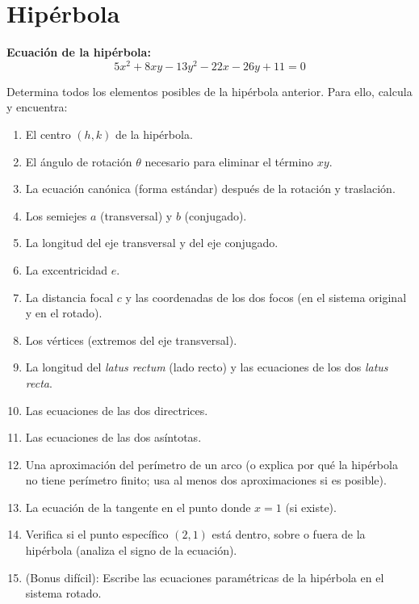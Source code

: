 \documentclass[12pt, a4paper]{article}
\begin{document}
\section{Hipérbola}
\textbf{Ecuación de la hipérbola:}
\[
5x^{2} + 8xy - 13y^{2} - 22x - 26y + 11 = 0
\]

Determina todos los elementos posibles de la hipérbola anterior. Para ello, calcula y encuentra:

\begin{enumerate}
    \item El centro \((h, k)\) de la hipérbola.
    \item El ángulo de rotación \(\theta\) necesario para eliminar el término \(xy\).
    \item La ecuación canónica (forma estándar) después de la rotación y traslación.
    \item Los semiejes \(a\) (transversal) y \(b\) (conjugado).
    \item La longitud del eje transversal y del eje conjugado.
    \item La excentricidad \(e\).
    \item La distancia focal \(c\) y las coordenadas de los dos focos (en el sistema original y en el rotado).
    \item Los vértices (extremos del eje transversal).
    \item La longitud del \textit{latus rectum} (lado recto) y las ecuaciones de los dos \textit{latus recta}.
    \item Las ecuaciones de las dos directrices.
    \item Las ecuaciones de las dos asíntotas.
    \item Una aproximación del perímetro de un arco (o explica por qué la hipérbola no tiene perímetro finito; usa al menos dos aproximaciones si es posible).
    \item La ecuación de la tangente en el punto donde \(x = 1\) (si existe).
    \item Verifica si el punto específico \((2,1)\) está dentro, sobre o fuera de la hipérbola (analiza el signo de la ecuación).
    \item (Bonus difícil): Escribe las ecuaciones paramétricas de la hipérbola en el sistema rotado.
\end{enumerate}
\end{document}
